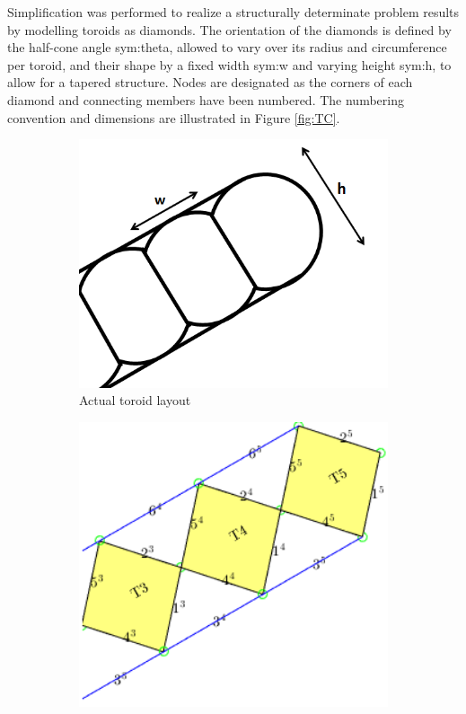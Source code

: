 Simplification was performed to realize a structurally determinate problem results by modelling toroids as diamonds. The orientation of the diamonds is defined by the half-cone angle \gls{sym:theta}, allowed to vary over its radius and circumference per toroid, and their shape by a fixed width \gls{sym:w} and varying height \gls{sym:h}, to allow for a tapered structure. Nodes are designated as the corners of each diamond and connecting members have been numbered. The numbering convention and dimensions are illustrated in Figure \ref{fig:TC}. 

\begin{figure}[h]
	\centering
	\begin{subfigure}[b]{0.3\textwidth}
	\centering
	\includegraphics[width=1.0\textwidth]{./Figure/Structure/ToroidConfig.png}
	\caption{Actual toroid layout} 
	\label{fig:TC1}
	\end{subfigure}
	\begin{subfigure}[b]{0.3\textwidth}
	\centering
	\includegraphics[width=1.0\textwidth]{./Figure/Structure/ToroidConfig2.png}

\end{subfigure}
\end{figure}
